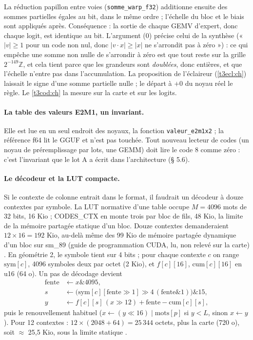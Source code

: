 La réduction papillon entre voies (\texttt{somme\_warp\_f32}) additionne ensuite des sommes partielles égales au bit, dans le même ordre ; l'échelle du bloc et le biais sont appliqués après. Conséquence : la sortie de chaque GEMV d'expert, donc chaque logit, est identique au bit. L'argument (0) précise celui de la synthèse (« $|v| \ge 1$ pour un code non nul, donc $|v\cdot x| \ge |x|$ ne s'arrondit pas à zéro ») : ce qui empêche une somme non nulle de s'arrondir à zéro est que tout reste sur la grille $2^{-149}\mathbb{Z}$, et cela tient parce que les grandeurs sont \emph{doublées}, donc entières, et que l'échelle n'entre pas dans l'accumulation. La proposition de l'éclaireur (\cref{t3ecl:ch}) laissait le signe d'une somme partielle nulle ; le départ à $+0$ du noyau réel le règle. Le \cref{t3cod:ch} la mesure sur la carte et sur les logits.

\paragraph{La table des valeurs E2M1, un invariant.} Elle est lue en un seul endroit des noyaux, la fonction \texttt{valeur\_\allowbreak e2m1x2} ; la référence f64 lit le GGUF et n'est pas touchée. Tout nouveau lecteur de codes (un noyau de préremplissage par lots, une GEMM) doit lire le code 8 comme zéro : c'est l'invariant que le lot A a écrit dans l'architecture (§ 5.6).

\paragraph{Le décodeur et la LUT compacte.} Si le contexte de colonne entrait dans le format, il faudrait un décodeur à douze contextes par symbole. La LUT normative d'une table occupe $M = \num{4096}$ mots de 32 bits, 16 Kio ; CODES\_CTX en monte trois par bloc de fils, 48 Kio, la limite de la mémoire partagée statique d'un bloc. Douze contextes demanderaient $12 \times 16 = 192$ Kio, au-delà même des 99 Kio de mémoire partagée dynamique d'un bloc sur sm\_89 (guide de programmation CUDA, lu, non relevé sur la carte) \litt. En géométrie 2, le symbole tient sur 4 bits ; pour chaque contexte $c$ on range $\mathrm{sym}[c]$, \num{4096} symboles deux par octet (2 Kio), et $f[c][16]$, $\mathrm{cum}[c][16]$ en u16 (64 o). Un pas de décodage devient
\begin{align*}
\text{fente} &\leftarrow x \mathbin{\&} 4095,\\
s &\leftarrow \bigl(\mathrm{sym}[c][\text{fente} \gg 1] \gg 4\,(\text{fente} \mathbin{\&} 1)\bigr) \mathbin{\&} 15,\\
y &\leftarrow f[c][s]\,(x \gg 12) + \text{fente} - \mathrm{cum}[c][s],
\end{align*}
puis le renouvellement habituel ($x \leftarrow (y \ll 16) \mid \text{mots}[p]$ si $y < L$, sinon $x \leftarrow y$). Pour 12 contextes : $12 \times (2048 + 64) = 25\,344$ octets, plus la carte (720 o), soit $\approx$ 25,5 Kio, sous la limite statique \calc.

